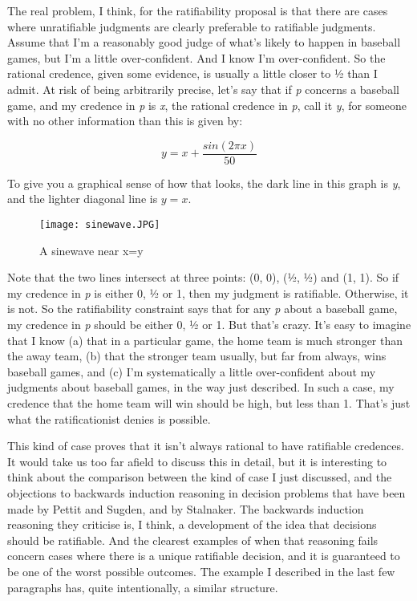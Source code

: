\documentclass[
  10pt,
  letterpaper,
  DIV=11,
  numbers=noendperiod,
  twoside]{scrartcl}
\begin{document}
The real problem, I think, for the ratifiability proposal is that there
are cases where unratifiable judgments are clearly preferable to
ratifiable judgments. Assume that I'm a reasonably good judge of what's
likely to happen in baseball games, but I'm a little over-confident. And
I know I'm over-confident. So the rational credence, given some
evidence, is usually a little closer to ½ than I admit. At risk of being
arbitrarily precise, let's say that if \emph{p} concerns a baseball
game, and my credence in \emph{p} is \emph{x}, the rational credence in
\emph{p}, call it \emph{y}, for someone with no other information than
this is given by:

\[y = x + \frac{sin(2\pi x)}{50}\]

To give you a graphical sense of how that looks, the dark line in this
graph is \emph{y}, and the lighter diagonal line is \(y = x\).

\begin{figure}[H]

{\centering \texttt{[image: sinewave.JPG]}

}

\caption{A sinewave near x=y}

\end{figure}%

Note that the two lines intersect at three points: (0, 0), (½, ½) and
(1, 1). So if my credence in \emph{p} is either 0, ½ or 1, then my
judgment is ratifiable. Otherwise, it is not. So the ratifiability
constraint says that for any \emph{p} about a baseball game, my credence
in \emph{p} should be either 0, ½ or 1. But that's crazy. It's easy to
imagine that I know (a) that in a particular game, the home team is much
stronger than the away team, (b) that the stronger team usually, but far
from always, wins baseball games, and (c) I'm systematically a little
over-confident about my judgments about baseball games, in the way just
described. In such a case, my credence that the home team will win
should be high, but less than 1. That's just what the ratificationist
denies is possible.

This kind of case proves that it isn't always rational to have
ratifiable credences. It would take us too far afield to discuss this in
detail, but it is interesting to think about the comparison between the
kind of case I just discussed, and the objections to backwards induction
reasoning in decision problems that have been made by Pettit and Sugden,
and by Stalnaker. The backwards induction reasoning they criticise is, I
think, a development of the idea that decisions should be ratifiable.
And the clearest examples of when that reasoning fails concern cases
where there is a unique ratifiable decision, and it is guaranteed to be
one of the worst possible outcomes. The example I described in the last
few paragraphs has, quite intentionally, a similar structure.
\end{document}
